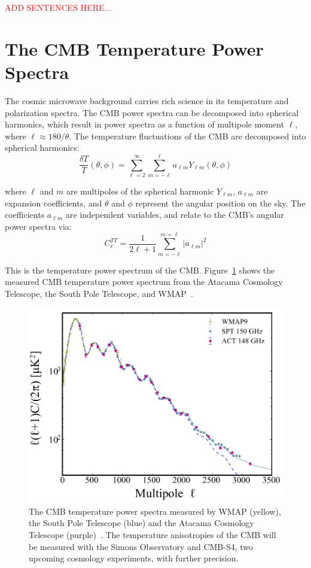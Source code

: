 \textcolor{red}{ADD SENTENCES HERE...}

\section{The CMB Temperature Power Spectra}
The cosmic microwave background carries rich science in its temperature and polarization spectra.  The CMB power spectra can be decomposed into spherical harmonics, which result in power spectra as a function of multipole moment $\ell$, where $\ell\approx180/\theta$.  The temperature fluctuations of the CMB are decomposed into spherical harmonics:
\begin{equation}
\frac{\delta T}{T}(\theta,\phi) = \sum_{\ell=2}^{\infty} \sum_{m=-\ell}^{\ell} a_{\ell m} Y_{\ell m}(\theta,\phi)
    \label{eq:cmb_temp}
\end{equation}

where $\ell$ and $m$ are multipoles of the spherical harmonic $Y_{\ell m}$, $a_{\ell m}$ are expansion coefficients, and $\theta$ and $\phi$ represent the angular position on the sky.  The coefficients $a_{\ell m}$ are independent variables, and relate to the CMB's angular power spectra via:
\begin{equation}
    C_\ell^{TT} = \frac{1}{2\ell +1} \sum_{m=-\ell}^{m=\ell} |a_{\ell m}|^2
\end{equation}

This is the temperature power spectrum of the CMB.  Figure~\ref{fig:measured_cmb_spec} shows the measured CMB temperature power spectrum from the Atacama Cosmology Telescope, the South Pole Telescope, and WMAP~\cite{Das_2014}.
\begin{figure}[t]
    \centering
    \includegraphics[width = .8\textwidth]{Figures/temp_power_spectrum.pdf}
    \caption{The CMB temperature power spectra measured by WMAP (yellow), the South Pole Telescope (blue) and the Atacama Cosmology Telescope (purple)~\cite{Das_2014}.  The temperature anisotropies of the CMB will be measured with the Simons Observatory and CMB-S4, two upcoming cosmology experiments, with further precision.}
    \label{fig:measured_cmb_spec}
\end{figure}

